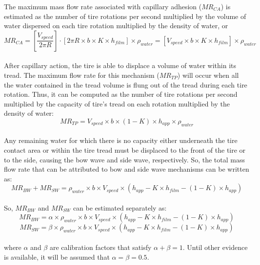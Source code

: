 \documentclass[12pt]{article}
\begin{document}
The maximum mass flow rate associated with capillary adhesion ($MR_{CA}$) is estimated as the number of tire rotations per second multiplied by the volume of water dispersed on each tire rotation multiplied by the density of water, or
 \[ 
MR_{CA} = \left[\frac{V_{speed}}{2\pi R}\right] \cdot \left[ 2\pi R \times b \times K \times h_{film} \right] \times \rho_{water} = \left[V_{speed} \times b \times K \times h_{film} \right] \times  \rho_{water} 
\]
\\
After capillary action, the tire is able to displace a volume of water within its tread. The maximum flow rate for this mechanism ($MR_{TP}$) will occur when all the water contained in the tread volume is flung out of the tread during each tire rotation. Thus, it can be computed as the number of tire rotations per second multiplied by the capacity of tire’s tread on each rotation multiplied by the density of water:
 \[ 
MR_{TP} = V_{speed} \times b \times (1-K) \times h_{app} \times \rho_{water} 
\]
\\
Any remaining water for which there is no capacity either underneath the tire contact area or within the tire tread must be displaced to the front of the tire or to the side, causing the bow wave and side wave, respectively. So, the total mass flow rate that can be attributed to bow and side wave mechanisms can be written as:
 \[ 
MR_{BW} + MR_{SW} =  \rho_{water} \times b \times V_{speed} \times (h_{app} - K \times h_{film} - (1-K) \times h_{app}) \]
\\
So, $MR_{BW}$ and $MR_{SW}$ can be estimated separately as:
 \[ 
MR_{BW} =  \alpha \times \rho_{water} \times b \times V_{speed} \times (h_{app} - K \times h_{film} - (1-K) \times h_{app}) \]
 \[
MR_{SW} = \beta \times \rho_{water} \times b \times V_{speed} \times (h_{app} - K \times h_{film} - (1-K) \times h_{app}) \]
\\
where $\alpha$ and $\beta$ are calibration factors that satisfy $\alpha + \beta = 1$. Until other evidence is available, it will be assumed that $\alpha = \beta = 0.5$.


\end{document}
